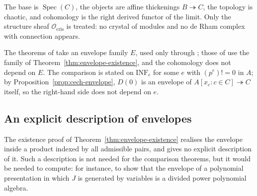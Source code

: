 \documentclass[11pt]{amsart}
\newcommand{\spa}{\medskip}
\newcommand{\Ocris}{\mathcal{O}_{\mathrm{cris}}}
\DeclareMathOperator{\Spec}{Spec}
\newcommand{\INF}{\mathrm{INF}}
\theoremstyle{plain}
\theoremstyle{definition}
\theoremstyle{remark}
\begin{document}
\spa

The base is $\Spec(C)$, the objects are affine thickenings $B \twoheadrightarrow C$, the topology is chaotic, and cohomology is the right derived functor of the limit. Only the structure sheaf $\Ocris$ is treated: no crystal of modules and no de Rham complex with connection appears.

\spa

The theorems of  take an envelope family $E$, used only through ; those of  use the family  of Theorem~\ref{thm:envelope-existence}, and the cohomology does not depend on $E$. The comparison is stated on $\INF_e$ for some $e$ with $(p^e)! = 0$ in $A$; by Proposition~\ref{prop:cech-envelope}, $D(0)$ is an envelope of $A[x_c : c \in C] \twoheadrightarrow C$ itself, so the right-hand side does not depend on $e$.

\subsection{An explicit description of envelopes}\label{subsec:existence}

The existence proof of Theorem~\ref{thm:envelope-existence} realises the envelope inside a product indexed by all admissible pairs, and gives no explicit description of it. Such a description is not needed for the comparison theorems, but it would be needed to compute: for instance, to show that the envelope of a polynomial presentation in which $J$ is generated by variables is a divided power polynomial algebra.

\spa
\end{document}
